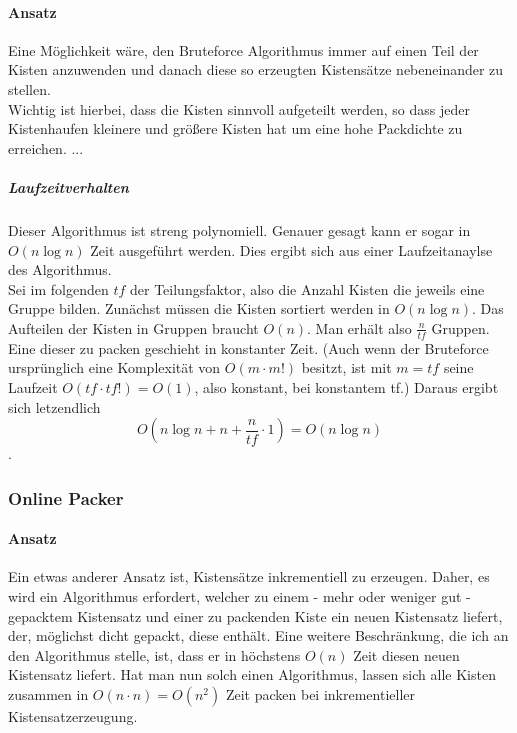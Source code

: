 \paragraph{Ansatz} Eine Möglichkeit wäre,
den Bruteforce Algorithmus immer auf einen Teil der Kisten anzuwenden und danach diese so erzeugten Kistensätze nebeneinander zu stellen. \\
Wichtig ist hierbei, dass die Kisten sinnvoll aufgeteilt werden, so dass jeder Kistenhaufen kleinere und größere Kisten hat um eine hohe Packdichte zu erreichen.
...
\subparagraph{Laufzeitverhalten}
Dieser Algorithmus ist streng polynomiell. Genauer gesagt kann er sogar in $O(n \log n)$ Zeit ausgeführt werden.
Dies ergibt sich aus einer Laufzeitanaylse des Algorithmus. \\
Sei im folgenden $tf$ der Teilungsfaktor, also die Anzahl Kisten die jeweils eine Gruppe bilden.
Zunächst müssen die Kisten sortiert werden in $O(n \log n)$.
Das Aufteilen der Kisten in Gruppen braucht $O(n)$. Man erhält also $\frac{n}{tf}$ Gruppen.
Eine dieser zu packen geschieht in konstanter Zeit. (Auch wenn der Bruteforce ursprünglich eine Komplexität von $O(m \cdot m!)$ besitzt,
ist mit $m=tf$ seine Laufzeit $O(tf \cdot tf!) = O(1)$, also konstant, bei konstantem tf.)
Daraus ergibt sich letzendlich \[ O(n\log n + n + \frac{n}{tf} \cdot 1) = O(n\log n) \].
\subsubsection{Online Packer}
\paragraph{Ansatz}
Ein etwas anderer Ansatz ist, Kistensätze inkrementiell zu erzeugen.
Daher, es wird ein Algorithmus erfordert,
welcher zu einem - mehr oder weniger gut - gepacktem Kistensatz und einer zu packenden Kiste ein neuen Kistensatz liefert,
der, möglichst dicht gepackt, diese enthält.
Eine weitere Beschränkung, die ich an den Algorithmus stelle, ist, dass er in höchstens $O(n)$ Zeit diesen neuen Kistensatz liefert.
Hat man nun solch einen Algorithmus, lassen sich alle Kisten zusammen in $O(n \cdot n)=O(n^2)$ Zeit packen bei inkrementieller Kistensatzerzeugung. 
